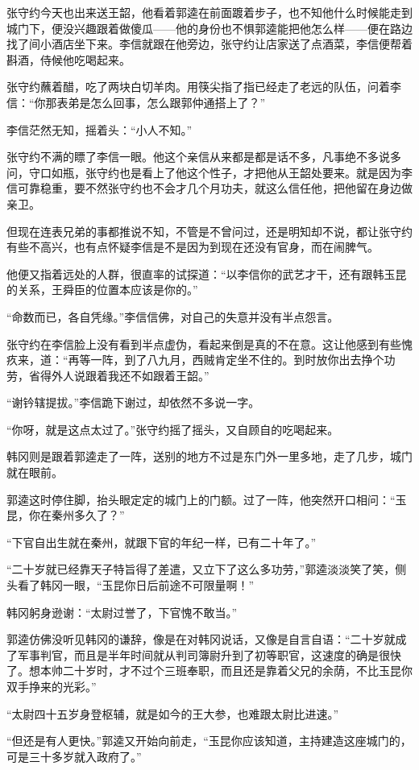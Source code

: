张守约今天也出来送王韶，他看着郭逵在前面踱着步子，也不知他什么时候能走到城门下，便没兴趣跟着做傻瓜——他的身份也不惧郭逵能把他怎么样——便在路边找了间小酒店坐下来。李信就跟在他旁边，张守约让店家送了点酒菜，李信便帮着斟酒，侍候他吃喝起来。

张守约蘸着醋，吃了两块白切羊肉。用筷尖指了指已经走了老远的队伍，问着李信：“你那表弟是怎么回事，怎么跟郭仲通搭上了？”

李信茫然无知，摇着头：“小人不知。”

张守约不满的瞟了李信一眼。他这个亲信从来都是都是话不多，凡事绝不多说多问，守口如瓶，张守约也是看上了他这个性子，才把他从王韶处要来。就是因为李信可靠稳重，要不然张守约也不会才几个月功夫，就这么信任他，把他留在身边做亲卫。

但现在连表兄弟的事都推说不知，不管是不曾问过，还是明知却不说，都让张守约有些不高兴，也有点怀疑李信是不是因为到现在还没有官身，而在闹脾气。

他便又指着远处的人群，很直率的试探道：“以李信你的武艺才干，还有跟韩玉昆的关系，王舜臣的位置本应该是你的。”

“命数而已，各自凭缘。”李信信佛，对自己的失意并没有半点怨言。

张守约在李信脸上没有看到半点虚伪，看起来倒是真的不在意。这让他感到有些愧疚来，道：“再等一阵，到了八九月，西贼肯定坐不住的。到时放你出去挣个功劳，省得外人说跟着我还不如跟着王韶。”

“谢钤辖提拔。”李信跪下谢过，却依然不多说一字。

“你呀，就是这点太过了。”张守约摇了摇头，又自顾自的吃喝起来。

韩冈则是跟着郭逵走了一阵，送别的地方不过是东门外一里多地，走了几步，城门就在眼前。

郭逵这时停住脚，抬头眼定定的城门上的门额。过了一阵，他突然开口相问：“玉昆，你在秦州多久了？”

“下官自出生就在秦州，就跟下官的年纪一样，已有二十年了。”

“二十岁就已经靠天子特旨得了差遣，又立下了这么多功劳，”郭逵淡淡笑了笑，侧头看了韩冈一眼，“玉昆你日后前途不可限量啊！”

韩冈躬身逊谢：“太尉过誉了，下官愧不敢当。”

郭逵仿佛没听见韩冈的谦辞，像是在对韩冈说话，又像是自言自语：“二十岁就成了军事判官，而且是半年时间就从判司簿尉升到了初等职官，这速度的确是很快了。想本帅二十岁时，才不过个三班奉职，而且还是靠着父兄的余荫，不比玉昆你双手挣来的光彩。”

“太尉四十五岁身登枢辅，就是如今的王大参，也难跟太尉比进速。”

“但还是有人更快。”郭逵又开始向前走，“玉昆你应该知道，主持建造这座城门的，可是三十多岁就入政府了。”

